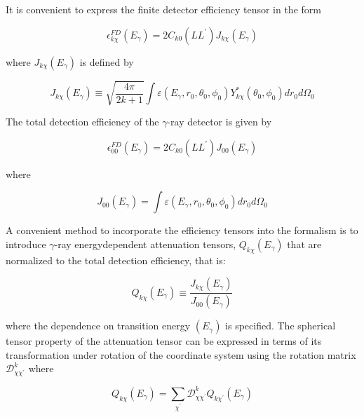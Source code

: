 \documentclass[10pt]{article}
\begin{document}
It is convenient to express the finite detector efficiency tensor in the form

$$
\epsilon_{k \chi}^{F D}\left(E_{\gamma}\right)=2 C_{k 0}\left(L L^{\prime}\right) J_{k \chi}\left(E_{\gamma}\right)
$$

where $J_{k \chi}\left(E_{\gamma}\right)$ is defined by


\begin{equation*}
J_{k \chi}\left(E_{\gamma}\right) \equiv \sqrt{\frac{4 \pi}{2 k+1}} \int \varepsilon\left(E_{\gamma}, r_{0}, \theta_{0}, \phi_{0}\right) Y_{k \chi}^{*}\left(\theta_{0}, \phi_{0}\right) d r_{0} d \Omega_{0} \tag{4.43}
\end{equation*}


The total detection efficiency of the $\gamma$-ray detector is given by


\begin{equation*}
\epsilon_{00}^{F D}\left(E_{\gamma}\right)=2 C_{k 0}\left(L L^{\prime}\right) J_{00}\left(E_{\gamma}\right) \tag{4.44}
\end{equation*}


where


\begin{equation*}
J_{00}\left(E_{\gamma}\right)=\int \varepsilon\left(E_{\gamma}, r_{0}, \theta_{0}, \phi_{0}\right) d r_{0} d \Omega_{0} \tag{4.45}
\end{equation*}


A convenient method to incorporate the efficiency tensors into the formalism is to introduce $\gamma$-ray energydependent attenuation tensors, $Q_{k \chi}\left(E_{\gamma}\right)$ that are normalized to the total detection efficiency, that is:


\begin{equation*}
Q_{k \chi}\left(E_{\gamma}\right) \equiv \frac{J_{k \chi}\left(E_{\gamma}\right)}{J_{00}\left(E_{\gamma}\right)} \tag{4.46}
\end{equation*}


where the dependence on transition energy $\left(E_{\gamma}\right)$ is specified. The spherical tensor property of the attenuation tensor can be expressed in terms of its transformation under rotation of the coordinate system using the rotation matrix $\mathcal{D}_{\chi \chi^{\prime}}^{k}$ where


\begin{equation*}
Q_{k \chi}\left(E_{\gamma}\right)=\sum_{\chi^{\prime}} \mathcal{D}_{\chi \chi^{\prime}}^{k} Q_{k \chi^{\prime}}\left(E_{\gamma}\right) \tag{4.47}
\end{equation*}
\end{document}

